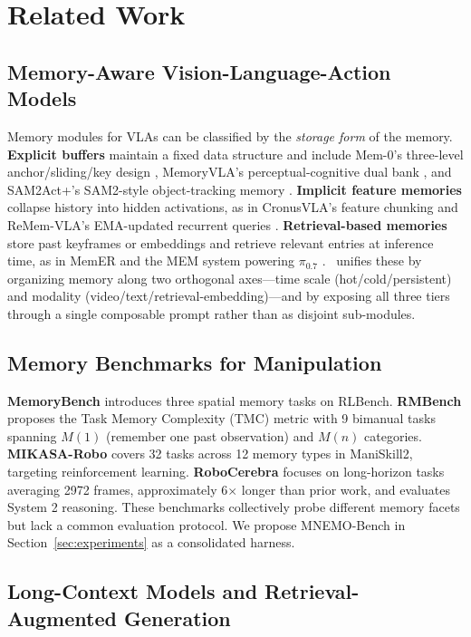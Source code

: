 \section{Related Work}
\label{sec:related}

\subsection{Memory-Aware Vision-Language-Action Models}

Memory modules for VLAs can be classified by the \emph{storage form}
of the memory. \textbf{Explicit buffers} maintain a fixed data
structure and include Mem-0's three-level anchor/sliding/key
design \cite{rmbench}, MemoryVLA's perceptual-cognitive dual
bank \cite{memoryvla}, and SAM2Act+'s SAM2-style object-tracking
memory \cite{sam2act}. \textbf{Implicit feature memories} collapse
history into hidden activations, as in CronusVLA's feature
chunking \cite{cronusvla} and ReMem-VLA's EMA-updated recurrent
queries \cite{rememvla}. \textbf{Retrieval-based memories} store past
keyframes or embeddings and retrieve relevant entries at inference
time, as in MemER \cite{memer} and the MEM system powering
$\pi_{0.7}$ \cite{mem}. \method\ unifies these by organizing memory
along two orthogonal axes---time scale (hot/cold/persistent) and
modality (video/text/retrieval-embedding)---and by exposing all three
tiers through a single composable prompt rather than as disjoint
sub-modules.

\subsection{Memory Benchmarks for Manipulation}

\textbf{MemoryBench} \cite{sam2act} introduces three spatial memory
tasks on RLBench. \textbf{RMBench} \cite{rmbench} proposes the Task
Memory Complexity (TMC) metric with 9 bimanual tasks spanning $M(1)$
(remember one past observation) and $M(n)$ categories.
\textbf{MIKASA-Robo} \cite{mikasa} covers 32 tasks across 12 memory
types in ManiSkill2, targeting reinforcement learning.
\textbf{RoboCerebra} \cite{robocerebra} focuses on long-horizon tasks
averaging 2972 frames, approximately 6$\times$ longer than prior
work, and evaluates System 2 reasoning. These benchmarks
collectively probe different memory facets but lack a common
evaluation protocol. We propose MNEMO-Bench in
Section~\ref{sec:experiments} as a consolidated harness.

\subsection{Long-Context Models and Retrieval-Augmented Generation}

